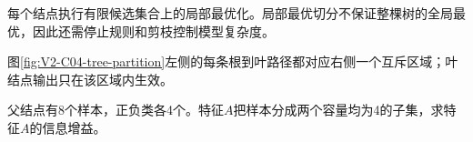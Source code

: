 \documentclass[UTF8,a4paper,11pt,openany]{ctexbook}
\begin{document}
\setcounter{page}{288}
\setcounter{chapter}{15}
\setcounter{figure}{0}
\pagestyle{headings}
\begin{optimizationbox}
每个结点执行有限候选集合上的局部最优化。局部最优切分不保证整棵树的全局最优，因此还需停止规则和剪枝控制模型复杂度。
\end{optimizationbox}

图\ref{fig:V2-C04-tree-partition}左侧的每条根到叶路径都对应右侧一个互斥区域；叶结点输出只在该区域内生效。
\begin{example}[八样本二叉划分的信息增益]
父结点有8个样本，正负类各4个。特征$A$把样本分成两个容量均为4的子集，求特征$A$的信息增益。
\end{example}
\end{document}
